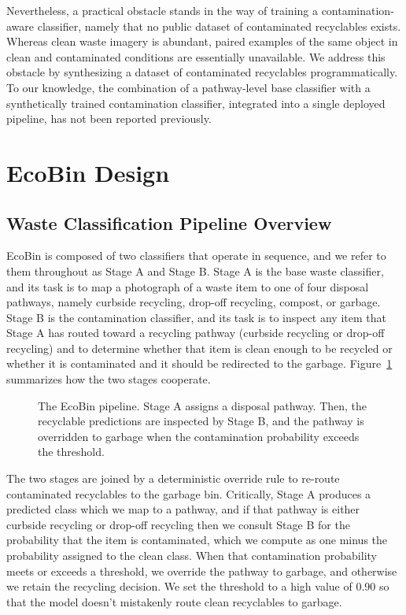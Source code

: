 \documentclass[10pt,twocolumn]{article}
\begin{document}
Nevertheless, a practical obstacle stands in the way of training a contamination-aware classifier, namely that no public dataset of contaminated recyclables exists. Whereas clean waste imagery is abundant, paired examples of the same object in clean and contaminated conditions are essentially unavailable. We address this obstacle by synthesizing a dataset of contaminated recyclables programmatically. To our knowledge, the combination of a pathway-level base classifier with a synthetically trained contamination classifier, integrated into a single deployed pipeline, has not been reported previously.

\section{EcoBin Design}
\subsection{Waste Classification Pipeline Overview}
EcoBin is composed of two classifiers that operate in sequence, and we refer to them throughout as Stage A and Stage B. Stage A is the base waste classifier, and its task is to map a photograph of a waste item to one of four disposal pathways, namely curbside recycling, drop-off recycling, compost, or garbage. Stage B is the contamination classifier, and its task is to inspect any item that Stage A has routed toward a recycling pathway (curbside recycling or drop-off recycling) and to determine whether that item is clean enough to be recycled or whether it is contaminated and it should be redirected to the garbage. Figure~\ref{fig:pipeline} summarizes how the two stages cooperate.

\begin{figure}[t]
\centering
\setlength{\fboxrule}{0.6pt}
\caption{The EcoBin pipeline. Stage A assigns a disposal pathway. Then, the recyclable predictions are inspected by Stage B, and the pathway is overridden to garbage when the contamination probability exceeds the threshold.}
\label{fig:pipeline}
\end{figure}

The two stages are joined by a deterministic override rule to re-route contaminated recyclables to the garbage bin. Critically, Stage A produces a predicted class which we map to a pathway, and if that pathway is either curbside recycling or drop-off recycling then we consult Stage B for the probability that the item is contaminated, which we compute as one minus the probability assigned to the clean class. When that contamination probability meets or exceeds a threshold, we override the pathway to garbage, and otherwise we retain the recycling decision. We set the threshold to a high value of 0.90 so that the model doesn't mistakenly route clean recyclables to garbage.
\end{document}
